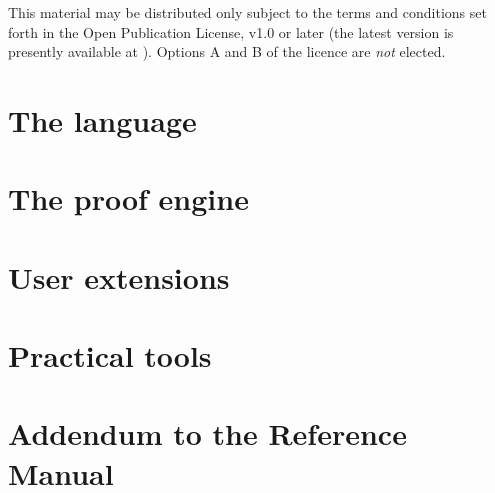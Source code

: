\documentclass[11pt,a4paper,pdftex]{book}
\begin{document}
\sloppy{}

\tophtml{}
  {This material may be distributed only subject to the terms and
   conditions set forth in the Open Publication License, v1.0 or later
   (the latest version is presently available at
   ).
   Options A and B of the licence are {\em not} elected.}


\tableofcontents

\part{The language}


\part{The proof engine}

\part{User extensions}

\part{Practical tools}

\part{Addendum to the Reference Manual}
%
%
%
%
%
\nocite{*}



\printindex
{}

\printindex[tactic]

\printindex[command]

\printindex[error]

\listoffigures
{}
\end{document}
